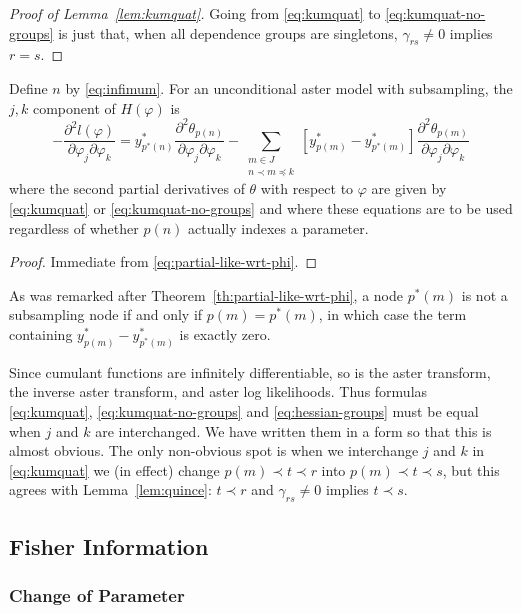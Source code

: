 \begin{proof}[Proof of Lemma~\ref{lem:kumquat}]
Going from \eqref{eq:kumquat} to \eqref{eq:kumquat-no-groups} is just that,
when all dependence groups are singletons, $\gamma_{r s} \neq 0$ implies
$r = s$.
\end{proof}

\begin{theorem} \label{th:hessian-uam}
Define $n$ by \eqref{eq:infimum}.
For an unconditional aster model with subsampling,
the $j, k$ component of $H(\varphi)$ is
\begin{equation} \label{eq:hessian-groups}
   - \frac{\partial^2 l(\varphi)}{\partial \varphi_j \partial \varphi_k}
   =
   y^*_{p^*(n)}
   \frac{\partial^2 \theta_{p(n)}}{\partial \varphi_j \partial \varphi_k}
   -
   \sum_{\substack{m \in J \\ n \prec m \preceq k}}
   \left[ y^*_{p(m)} - y^*_{p^*(m)} \right]
   \frac{\partial^2 \theta_{p(m)}}{\partial \varphi_j \partial \varphi_k}
\end{equation}
where the second partial derivatives of $\theta$ with respect to $\varphi$
are given by \eqref{eq:kumquat} or \eqref{eq:kumquat-no-groups}
and where these equations are to be used regardless of whether $p(n)$
actually indexes a parameter.
\end{theorem}
\begin{proof}
Immediate from \eqref{eq:partial-like-wrt-phi}.
\end{proof}
As was remarked after Theorem~\ref{th:partial-like-wrt-phi},
a node $p^*(m)$ is not a subsampling node if and only if $p(m) = p^*(m)$,
in which case the term containing $y^*_{p(m)} - y^*_{p^*(m)}$ is exactly zero.

Since cumulant functions are infinitely differentiable,
so is the aster transform, the inverse aster transform,
and aster log likelihoods.  Thus formulas \eqref{eq:kumquat},
\eqref{eq:kumquat-no-groups} and \eqref{eq:hessian-groups}
must be equal when $j$ and $k$ are interchanged.
We have written them in a form so that this is almost obvious.
The only non-obvious spot is when we interchange $j$ and $k$
in \eqref{eq:kumquat} we (in effect) change $p(m) \prec t \prec r$
into $p(m) \prec t \prec s$, but this agrees with Lemma~\ref{lem:quince}:
$t \prec r$ and $\gamma_{r s} \neq 0$ implies $t \prec s$.

\subsection{Fisher Information}
\label{sec:fisher}

\subsubsection{Change of Parameter}

